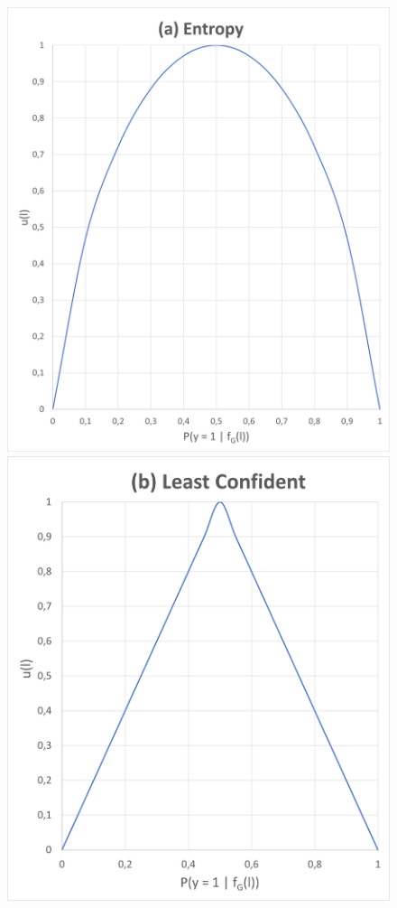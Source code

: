 \begin{figure}[H]
    \centering
    \begin{minipage}{.4\textwidth}
      \centering
      \includegraphics[width=\linewidth]{figures/entropy_graph.PNG}
    \end{minipage}%
    \begin{minipage}{.4\textwidth}
      \centering
      \includegraphics[width=\linewidth]{figures/least_confident_graph.PNG}

\end{minipage}
\end{figure}
